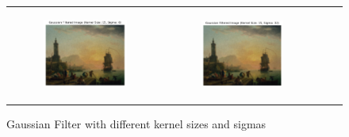 \documentclass[hidelinks,12pt]{article}
\begin{document}
\begin{figure}[!h]
{\begin{tabular}{cccc}
\begin{subfigure}[h]{0.25\textwidth}
					\includegraphics[width=\textwidth]{figures/gaussian_filter/15.png}
				\end{subfigure} &
				\begin{subfigure}[h]{0.25\textwidth}
					\centering
					\includegraphics[width=\textwidth]{figures/gaussian_filter/16.png}
				\end{subfigure}
			\end{tabular}
		}
		\caption{Gaussian Filter with different kernel sizes and sigmas}
	\end{figure}
	
	
\end{document}
